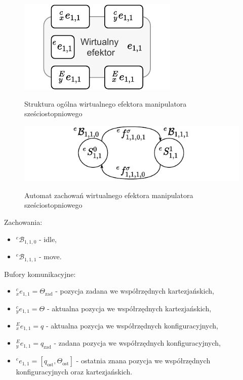\begin{figure}
    \centering
    \includegraphics[width=0.75\columnwidth]{figures/ISR-ve-manip-model.pdf}
    \label{fig:model-vr-camera}
    \caption{Struktura ogólna wirtualnego efektora manipulatora sześciostopniowego}
\end{figure}

\begin{figure}
    \centering
    \includegraphics[width=\columnwidth]{figures/ISR-ve-manip-behaviours.pdf}
    \label{fig:zachowania-ve-manip}
    \caption{Automat zachowań wirtualnego efektora manipulatora sześciostopniowego}
\end{figure}

Zachowania:
\begin{itemize}
    \item ${}^{e}\mathcal{B}_{1,1,0}$ - idle,
    \item ${}^{e}\mathcal{B}_{1,1,1}$ - move.
\end{itemize}

Bufory komunikacyjne:
\begin{itemize}
    \item ${}^{c}_{x}e_{1,1} = \Theta_{\mathrm{zad}}$ - pozycja zadana we współrzędnych kartezjańskich,
    \item ${}^{c}_{y}e_{1,1} = \Theta$ - aktualna pozycja we współrzędnych kartezjańskich,
    \item ${}^{E}_{x}e_{1,1} = q$ - aktualna pozycja we współrzędnych konfiguracyjnych,
    \item ${}^{E}_{y}e_{1,1} = q_{\mathrm{zad}}$ - zadana pozycja we współrzędnych konfiguracyjnych,
    \item ${}^{e}e_{1,1} = [q_{\mathrm{ost}}, \Theta_{\mathrm{ost}}]$ - ostatnia znana pozycja we współrzędnych konfiguracyjnych oraz kartezjańskich.
\end{itemize}

